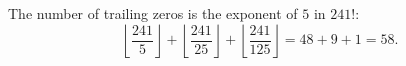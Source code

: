 The number of trailing zeros is the exponent of $5$ in $241!$:
\[\left\lfloor\dfrac{241}{5}\right\rfloor+\left\lfloor\dfrac{241}{25}\right\rfloor+\left\lfloor\dfrac{241}{125}\right\rfloor=48+9+1=\boxed{58}.\]
